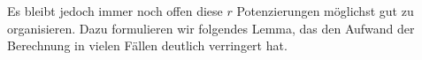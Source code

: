Es bleibt jedoch immer noch offen diese $r$ Potenzierungen möglichst gut
zu organisieren. 
Dazu formulieren wir folgendes Lemma, das den Aufwand der Berechnung
in vielen Fällen deutlich verringert hat.

